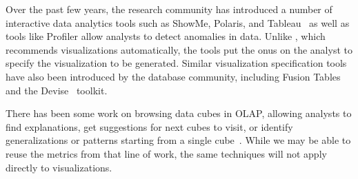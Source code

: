 

Over the past few years, the research community has introduced 
a number of interactive data analytics tools such as ShowMe, Polaris, and
Tableau~\cite{DBLP:journals/cacm/StolteTH08, DBLP:journals/tvcg/MackinlayHS07}
as well as tools like Profiler allow analysts to detect anomalies in data.
Unlike \SeeDB, which recommends visualizations automatically, the tools put the
onus on the analyst to specify the visualization to be generated.
Similar visualization specification tools have also been introduced
by the database community, including Fusion Tables~\cite{DBLP:conf/sigmod/GonzalezHJLMSSG10} 
and the Devise~\cite{DBLP:conf/sigmod/LivnyRBCDLMW97} toolkit.

There has been some work on browsing data cubes in OLAP, allowing
analysts to find explanations, get suggestions for next cubes to visit,
or identify generalizations or patterns starting from a single cube~\cite{DBLP:conf/vldb/Sarawagi99, 
DBLP:conf/vldb/SatheS01, DBLP:conf/vldb/Sarawagi00}. 
While we may be able to reuse the metrics from that line of work,
the same techniques will not apply directly to visualizations.



